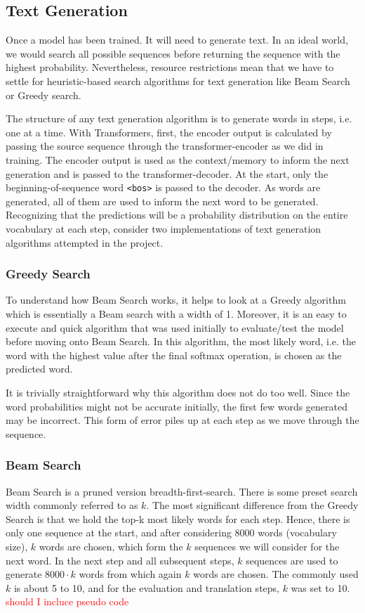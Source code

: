 \documentclass[12pt,a4paper,twoside,openright]{report}
\newcommand{\red}[1]{\textcolor{red}{#1}}
\begin{document}
\subsection{Text Generation}
\label{text-generation}
Once a model has been trained. It will need to generate text. 
In an ideal world, we would search all possible sequences before returning the sequence with the highest probability. Nevertheless, resource restrictions mean that we have to settle for heuristic-based search algorithms for text generation like Beam Search or Greedy search.

The structure of any text generation algorithm is to generate words in steps, i.e. one at a time. With Transformers, first, the encoder output is calculated by passing the source sequence through the transformer-encoder as we did in training. The encoder output is used as the context/memory to inform the next generation and is passed to the transformer-decoder. At the start, only the beginning-of-sequence word \lstinline{<bos>} is passed to the decoder. As words are generated, all of them are used to inform the next word to be generated. Recognizing that the predictions will be a probability distribution on the entire vocabulary at each step, consider two implementations of text generation algorithms attempted in the project. 

\subsubsection{Greedy Search}
To understand how Beam Search works, it helps to look at a Greedy algorithm which is essentially a Beam search with a width of 1. Moreover, it is an easy to execute and quick algorithm that was used initially to evaluate/test the model before moving onto Beam Search. In this algorithm, the most likely word, i.e. the word with the highest value after the final softmax operation, is chosen as the predicted word. 

It is trivially straightforward why this algorithm does not do too well. Since the word probabilities might not be accurate initially, the first few words generated may be incorrect. This form of error piles up at each step as we move through the sequence. 

\subsubsection{Beam Search}
Beam Search is a pruned version breadth-first-search. There is some preset search width commonly referred to as $k$. The most significant difference from the Greedy Search is that we hold the top-k most likely words for each step. Hence, there is only one sequence at the start, and after considering 8000 words (vocabulary size), $k$ words are chosen, which form the $k$ sequences we will consider for the next word. In the next step and all subsequent steps, $k$ sequences are used to generate $8000 \cdot k$ words from which again $k$ words are chosen. The commonly used $k$ is about 5 to 10, and for the evaluation and translation steps, $k$ was set to 10. \red{should I incluce pseudo code}
\end{document}
